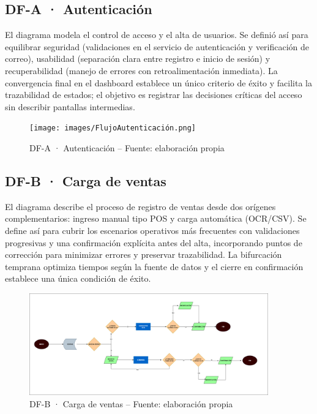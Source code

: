 \subsection{DF-A · Autenticación}
El diagrama modela el control de acceso y el alta de usuarios. Se definió así para equilibrar seguridad (validaciones en el servicio de autenticación y verificación de correo), usabilidad (separación clara entre registro e inicio de sesión) y recuperabilidad (manejo de errores con retroalimentación inmediata). La convergencia final en el dashboard establece un único criterio de éxito y facilita la trazabilidad de estados; el objetivo es registrar las decisiones críticas del acceso sin describir pantallas intermedias.

\begin{figure}[!htbp]
  \centering
  \texttt{[image: images/FlujoAutenticación.png]}
  \caption{DF-A · Autenticación -- Fuente: elaboración propia}
  \label{fig:df-a-autenticacion}
\end{figure}


\subsection{DF-B · Carga de ventas}
El diagrama describe el proceso de registro de ventas desde dos orígenes complementarios: ingreso manual tipo POS y carga automática (OCR/CSV). Se define así para cubrir los escenarios operativos más frecuentes con validaciones progresivas y una confirmación explícita antes del alta, incorporando puntos de corrección para minimizar errores y preservar trazabilidad. La bifurcación temprana optimiza tiempos según la fuente de datos y el cierre en confirmación establece una única condición de éxito.

\begin{figure}[!htbp]
  \centering
  \includegraphics[width=0.92\textwidth]{images/FlujoVentas.drawio.png}
  \caption{DF-B · Carga de ventas -- Fuente: elaboración propia}
  \label{fig:df-b-ventas}
\end{figure}


